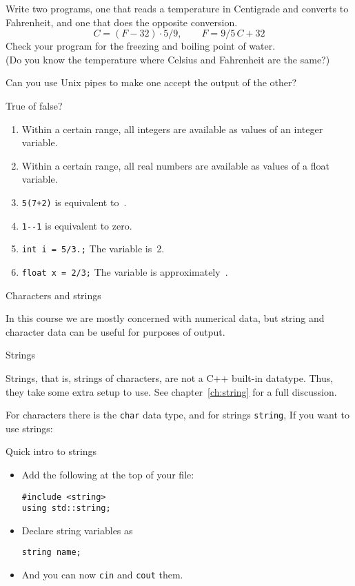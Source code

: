 \begin{exercise}
  \label{ex:C2F}
  Write two programs, one that reads a temperature in Centigrade and
  converts to Fahrenheit, and one that does the opposite conversion.
  \[ C = (F-32)\cdot 5/9,\qquad F = 9/5\,C+32 \]
  Check your program for the freezing and boiling point of water.\\
  (Do you know the temperature where Celsius and Fahrenheit are the
  same?)
  
  Can you use Unix pipes to make one accept the output of the other?
\end{exercise}

\begin{review}
  \label{q:vartypes}
  True of false?
  \begin{enumerate}
  \item Within a certain range, all integers are available as values of an
    integer variable.
  \item Within a certain range, all real numbers are available as values of a
    float variable.
  \item \verb-5(7+2)- is equivalent to~.
  \item \verb+1--1+ is equivalent to zero.
  \item \verb-int i = 5/3.;- The variable  is~2.
  \item \verb-float x = 2/3;- The variable  is approximately~.
  \end{enumerate}
\end{review}

 {Characters and strings}

In this course we are mostly concerned with numerical data,
but string and character data can be useful for purposes of output.

 {Strings}

Strings, that is, strings of characters, are not a C++ built-in
datatype. Thus, they take some extra setup to use.
See chapter~\ref{ch:string} for a full discussion.

For characters there is the \lstinline{char} data type,
and for strings \lstinline{string},
If you want to use strings:

\begin{block}{Quick intro to strings}
  \label{sl:quick-string}
  \begin{itemize}
  \item Add the following at the top of your file:
\begin{lstlisting}
#include <string>
using std::string;
\end{lstlisting}
\item Declare string variables as
\begin{lstlisting}
string name;
\end{lstlisting}
\item And you can now \lstinline{cin} and \lstinline{cout} them.
  \end{itemize}
\end{block}

